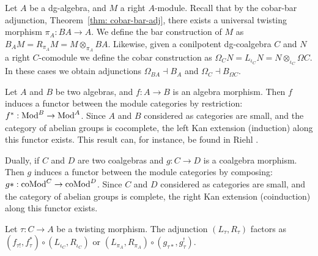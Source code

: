 \documentclass[../thesis.tex]{subfiles}
\begin{document}
            Let $A$ be a dg-algebra, and $M$ a right $A$-module. Recall that by the cobar-bar adjunction, Theorem~\ref{thm: cobar-bar-adj}, there exists a universal twisting morphism $\pi_A: BA \rightarrow A$. We define the bar construction of $M$ as $B_AM = R_{\pi_A}M = M\otimes_{\pi_A}BA$. Likewise, given a conilpotent dg-coalgebra $C$ and $N$ a right $C$-comodule we define the cobar construction as $\Omega_CN = L_{\iota_C}N = N\otimes_{\iota_C}\Omega C$. In these cases we obtain adjunctions $\Omega_{BA} \dashv B_A$ and $\Omega_C \dashv B_{\Omega C}$.

            Let $A$ and $B$ be two algebras, and $f: A \rightarrow B$ is an algebra morphism. Then $f$ induces a functor between the module categories by restriction: $f^*: \tt{Mod}^B \rightarrow \tt{Mod}^A$. Since $A$ and $B$ considered as categories are small, and the category of abelian groups is cocomplete, the left Kan extension (induction) along this functor exists. This result can, for instance, be found in Riehl \cite{Riehl14}.
            \begin{center}
            \end{center}

            Dually, if $C$ and $D$ are two coalgebras and $g: C \rightarrow D$ is a coalgebra morphism. Then $g$ induces a functor between the module categories by composing: $g*: \tt{coMod}^C \rightarrow \tt{coMod}^D$. Since $C$ and $D$ considered as categories are small, and the category of abelian groups is complete, the right Kan extension (coinduction) along this functor exists.
            \begin{center}
            \end{center}

            \begin{lemma}\label{lem: twist-fac}
                Let $\tau: C \rightarrow A$ be a twisting morphism. The adjunction $(L_\tau, R_\tau)$ factors as $(f_{\tau !}, f_\tau^*)\circ (L_{\iota_C},R_{\iota_C})$ or $(L_{\pi_A},R_{\pi_A})\circ (g_{\tau *}, g_\tau^!)$.
            \end{lemma}
\end{document}
